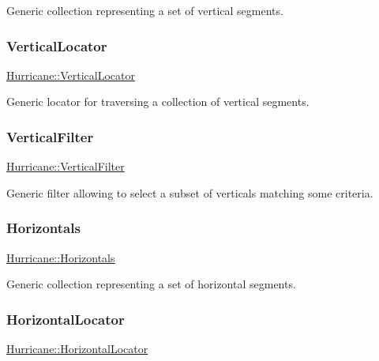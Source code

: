 Generic collection representing a set of vertical segments. \mbox{\label{namespaceHurricane_a0b7ececb547a716d7d509210a271aae4}} 
\subsubsection{\texorpdfstring{Vertical\+Locator}{VerticalLocator}}
{\footnotesize\ttfamily \hyperlink{namespaceHurricane_a0b7ececb547a716d7d509210a271aae4}{Hurricane\+::\+Vertical\+Locator}}

Generic locator for traversing a collection of vertical segments. \mbox{\label{namespaceHurricane_a3ac8462f707e425944df83c57835b13d}} 
\subsubsection{\texorpdfstring{Vertical\+Filter}{VerticalFilter}}
{\footnotesize\ttfamily \hyperlink{namespaceHurricane_a3ac8462f707e425944df83c57835b13d}{Hurricane\+::\+Vertical\+Filter}}

Generic filter allowing to select a subset of verticals matching some criteria. \mbox{\label{namespaceHurricane_a721e644c7d97f2f66049ab062140b855}} 
\subsubsection{\texorpdfstring{Horizontals}{Horizontals}}
{\footnotesize\ttfamily \hyperlink{namespaceHurricane_a721e644c7d97f2f66049ab062140b855}{Hurricane\+::\+Horizontals}}

Generic collection representing a set of horizontal segments. \mbox{\label{namespaceHurricane_a7f4e07165be3dfcec8786e88370bdb67}} 
\subsubsection{\texorpdfstring{Horizontal\+Locator}{HorizontalLocator}}
{\footnotesize\ttfamily \hyperlink{namespaceHurricane_a7f4e07165be3dfcec8786e88370bdb67}{Hurricane\+::\+Horizontal\+Locator}}

